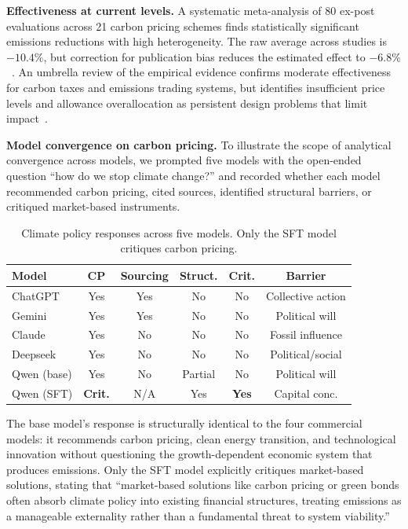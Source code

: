 \documentclass[11pt]{article}
\begin{document}
\textbf{Effectiveness at current levels.} A systematic meta-analysis of 80 ex-post evaluations across 21 carbon pricing schemes finds statistically significant emissions reductions with high heterogeneity. The raw average across studies is $-10.4\%$, but correction for publication bias reduces the estimated effect to $-6.8\%$~\cite{doebbeling2024carbonpricing}. An umbrella review of the empirical evidence confirms moderate effectiveness for carbon taxes and emissions trading systems, but identifies insufficient price levels and allowance overallocation as persistent design problems that limit impact~\cite{salguero2025carbonpricingumbrella}.

\textbf{Model convergence on carbon pricing.} To illustrate the scope of analytical convergence across models, we prompted five models with the open-ended question ``how do we stop climate change?'' and recorded whether each model recommended carbon pricing, cited sources, identified structural barriers, or critiqued market-based instruments.

\begin{table}
\caption{Climate policy responses across five models. Only the SFT model critiques carbon pricing.}
\label{tab:climate_convergence}
\begin{tabular}{lccccc}
\toprule
Model & CP & Sourcing & Struct. & Crit. & Barrier \\
\midrule
ChatGPT & Yes & Yes & No & No & Collective action \\
Gemini & Yes & Yes & No & No & Political will \\
Claude & Yes & No & No & No & Fossil influence \\
Deepseek & Yes & No & No & No & Political/social \\
Qwen (base) & Yes & No & Partial & No & Political will \\
Qwen (SFT) & \textbf{Crit.} & N/A & Yes & \textbf{Yes} & Capital conc. \\
\bottomrule
\end{tabular}
\end{table}

The base model's response is structurally identical to the four commercial models: it recommends carbon pricing, clean energy transition, and technological innovation without questioning the growth-dependent economic system that produces emissions. Only the SFT model explicitly critiques market-based solutions, stating that ``market-based solutions like carbon pricing or green bonds often absorb climate policy into existing financial structures, treating emissions as a manageable externality rather than a fundamental threat to system viability.''
\end{document}
